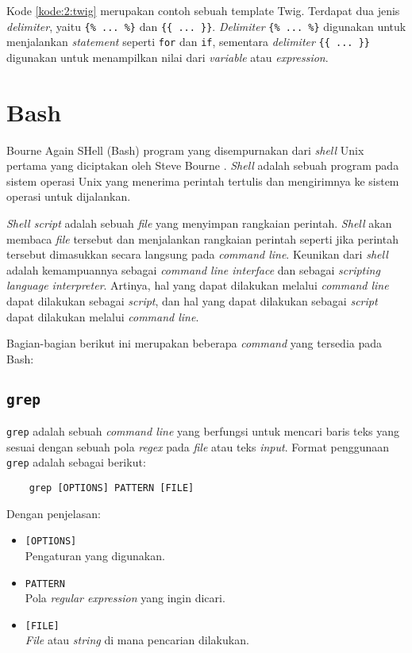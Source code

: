Kode \ref{kode:2:twig} merupakan contoh sebuah template Twig. Terdapat dua jenis \textit{delimiter}, yaitu \verb|{% ... %}| dan \verb|{{ ... }}|. \textit{Delimiter} \verb|{% ... %}| digunakan untuk menjalankan \textit{statement} seperti \verb|for| dan \verb|if|, sementara \textit{delimiter} \verb|{{ ... }}| digunakan untuk menampilkan nilai dari \textit{variable} atau \textit{expression}.

\section{Bash}
\label{sec:2:shell}
Bourne Again SHell (Bash) program yang disempurnakan dari \textit{shell} Unix pertama yang diciptakan oleh Steve Bourne \cite{linux}. \textit{Shell} adalah sebuah program pada sistem operasi Unix yang menerima perintah tertulis dan mengirimnya ke sistem operasi untuk dijalankan. 

\textit{Shell script} adalah sebuah \textit{file} yang menyimpan rangkaian perintah. \textit{Shell} akan membaca \textit{file} tersebut dan menjalankan rangkaian perintah seperti jika perintah tersebut dimasukkan secara langsung pada \textit{command line}. Keunikan dari \textit{shell} adalah kemampuannya sebagai \textit{command line interface} dan sebagai  \textit{scripting language interpreter}. Artinya, hal yang dapat dilakukan melalui \textit{command line} dapat dilakukan sebagai \textit{script}, dan hal yang dapat dilakukan sebagai \textit{script} dapat dilakukan melalui \textit{command line}.

Bagian-bagian berikut ini merupakan beberapa \textit{command} yang tersedia pada Bash:

\subsection{\texttt{grep}}
\verb|grep| adalah sebuah \textit{command line} yang berfungsi untuk mencari baris teks yang sesuai dengan sebuah pola \textit{regex} pada \textit{file} atau teks \textit{input}. Format penggunaan \verb|grep| adalah sebagai berikut:
\begin{verbatim}
    grep [OPTIONS] PATTERN [FILE]
\end{verbatim}
Dengan penjelasan:
\begin{itemize}
    \item \verb|[OPTIONS]| \\ Pengaturan yang digunakan.
    \item \verb|PATTERN| \\ Pola \textit{regular expression} yang ingin dicari.
    \item \verb|[FILE]| \\ \textit{File} atau \textit{string} di mana pencarian dilakukan.
\end{itemize}

